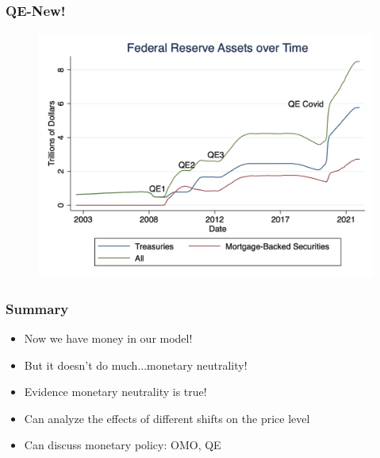 \documentclass{beamer}
\begin{document}
\begin{frame}
\frametitle[alignment=center]{QE-New!}
\begin{figure}
\centering
\includegraphics[scale=0.2]{Figures/Fig_12pt16b.png}
\end{figure}
\end{frame}

\begin{frame}
\frametitle[alignment=center]{Summary}
\begin{itemize}
\item Now we have money in our model!
\bigskip
\item But it doesn't do much...monetary neutrality!
\bigskip
\item Evidence monetary neutrality is true!
\bigskip
\item Can analyze the effects of different shifts on the price level
\bigskip
\item Can discuss monetary policy: OMO, QE
\end{itemize}
\end{frame}
\end{document}
